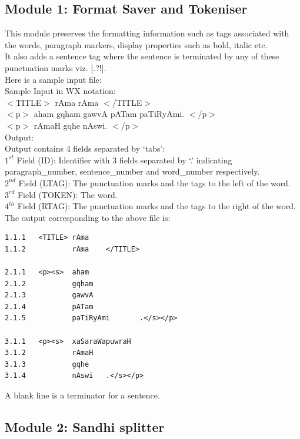 \documentclass{llncs}
\begin{document}
\subsection{Module 1: Format Saver and Tokeniser}
This module preserves the formatting information such as tags associated with the words, paragraph markers, display properties such as bold, italic etc.\\

\noindent 
It also adds a sentence tag where the sentence is terminated by any of these punctuation marks viz. [.?!]. \\

\noindent 
Here is a sample input file:\\

\noindent 
Sample Input in WX notation:\\
$<$TITLE$>$ rAma rAma $<$/TITLE$>$\\
$<$p$>$ aham gqham gawvA pATam paTiRyAmi. $<$/p$>$\\
$<$p$>$ rAmaH gqhe nAswi. $<$/p$>$\\

\noindent 
Output:\\
Output contains 4 fields separated by `tabs':\\
$1^{st}$ Field (ID): Identifier with 3 fields separated by `.' indicating paragraph\_number, sentence\_number and word\_number respectively.\\
$2^{nd}$ Field (LTAG): The punctuation marks and the tags to the left of the word.\\
$3^{rd}$ Field (TOKEN): The word.\\
$4^{th}$ Field (RTAG): The punctuation marks and the tags to the right of the word.\\

\noindent 
The output corresponding to the above file is:\\
\begin{verbatim}
1.1.1   <TITLE> rAma
1.1.2           rAma    </TITLE>

2.1.1   <p><s>  aham
2.1.2           gqham
2.1.3           gawvA
2.1.4           pATam
2.1.5           paTiRyAmi       .</s></p>

3.1.1   <p><s>  xaSaraWapuwraH
3.1.2           rAmaH
3.1.3           gqhe
3.1.4           nAswi   .</s></p>

\end{verbatim}
A blank line is a terminator for a sentence.

\subsection{Module 2: Sandhi splitter}
\end{document}
